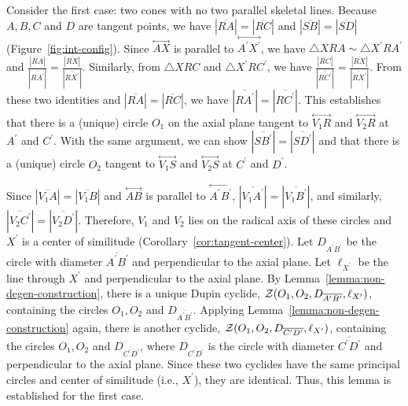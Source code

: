      Consider the first case: two cones with no two parallel skeletal lines.
Because $A, B, C$ and $D$ are tangent 
points, we have $|\overline{RA}|=|\overline{RC}|$ and 
$|\overline{SB}|=|\overline{SD}|$ (Figure~\ref{fig:int-config}).
Since $\stackrel{\longleftrightarrow}{AX}$ is parallel to
$\stackrel{\longleftrightarrow}{A^\prime X^\prime}$, we have
$\bigtriangleup XRA \sim\bigtriangleup X^\prime RA^\prime$ and
$\frac{|\overline{RA}|}{|\overline{RA^\prime}|}=
\frac{|\overline{RX}|}{|\overline{RX^\prime}|}$.  Similarly, from
$\bigtriangleup XRC$ and $\bigtriangleup X^\prime RC^\prime$, we have
$\frac{|\overline{RC}|}{|\overline{RC^\prime}|}=
\frac{|\overline{RX}|}{|\overline{RX^\prime}|}$.  From these two identities
and $|\overline{RA}|=|\overline{RC}|$, we have 
$|\overline{RA^\prime}|=|\overline{RC^\prime}|$.  
This establishes that there is a (unique) circle $O_1$ on the axial plane 
tangent to $\stackrel{\longleftrightarrow}{V_1R}$ and 
$\stackrel{\longleftrightarrow}{V_2R}$ at $A^\prime$ and $C^\prime$.
With the same argument, we can show 
$|\overline{SB^\prime}|=|\overline{SD^\prime}|$ and that
there is a (unique) circle
$O_2$ tangent to $\stackrel{\longleftrightarrow}{V_1S}$ and
$\stackrel{\longleftrightarrow}{V_2S}$ at $C^\prime$ and $D^\prime$.

     Since $|\overline{V_1A}|=|\overline{V_1B}|$ and
$\stackrel{\longleftrightarrow}{AB}$ is parallel to
$\stackrel{\longleftrightarrow}{A^\prime B^\prime}$,
$|\overline{V_1A^\prime}|=|\overline{V_1B^\prime}|$, and similarly,
$|\overline{V_2C^\prime}|=|\overline{V_2D^\prime}|$.
Therefore, $V_1$ and $V_2$ lies on the radical axis of these circles and
$X^\prime$ is a center of similitude (Corollary~\ref{cor:tangent-center}).
Let $D_{\overline{A^\prime B^\prime}}$ be the circle with diameter
$\overline{A^\prime B^\prime}$ and perpendicular to the axial plane.  
Let $\ell_{X^\prime}$ be the line through $X^\prime$ and perpendicular to the 
axial plane.  By Lemma~\ref{lemma:non-degen-construction}, there is a unique 
Dupin cyclide,
${\cal Z}(O_1,O_2,D_{\overline{A^\prime B^\prime}},\ell_{X^\prime})$,
containing the circles $O_1, O_2$ and $D_{\overline{A^\prime B^\prime}}$.  
Applying Lemma~\ref{lemma:non-degen-construction} again, there is another 
cyclide, ${\cal Z}(O_1,O_2,D_{\overline{C^\prime D^\prime}},\ell_{X^\prime})$,
containing the circles $O_1,O_2$ and $D_{\overline{C^\prime D^\prime}}$,
where $D_{\overline{C^\prime D^\prime}}$ is the circle with diameter
$\overline{C^\prime D^\prime}$ and perpendicular to the axial plane.
Since these two cyclides have the same principal circles and center of
similitude (i.e., $X^\prime$), they are identical.  Thus, this lemma is
established for the first case.

